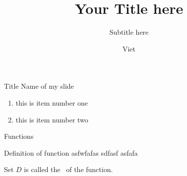 \documentclass{beamer}
\title{Your Title here}
\subtitle{Subtitle here}
\author{Viet}
\institute{blabla}
\date{}
\begin{document}
\begin{frame}
\titlepage
\end{frame}
\begin{frame}[t]{Title Name of my slide}\vspace{10pt}
\begin{enumerate}
\item this is item number one
\item this is item number two
\end{enumerate}
\end{frame}
\begin{frame}[t]{Functions}\vspace{4pt}
\begin{block}{Definition of function}
\vspace{0.5 em}
asfwfafas sdfasf asfafa
\vspace{0.5 em}
\end{block}
\vspace{10pt}
Set $D$ is called the 
\, of the function.\\
\end{frame}
\end{document}

